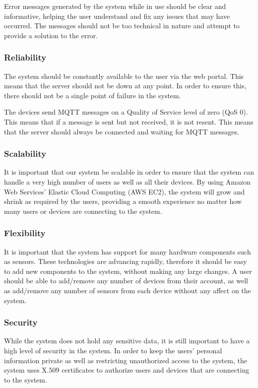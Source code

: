 \documentclass{article}
\begin{document}
			Error messages generated by the system while in use should be clear and informative, helping the user understand and fix any issues that may have occurred. The messages should not be too technical in nature and attempt to provide a solution to the error.
			
		\subsubsection{Reliability}
			The system should be constantly available to the user via the web portal. This means that the server should not be down at any point. In order to ensure this, there should not be a single point of failure in the system.
			
			The devices send MQTT messages on a Quality of Service level of zero (QoS 0). This means that if a message is sent but not received, it is not resent. This means that the server should always be connected and waiting for MQTT messages.
			
		\subsubsection{Scalability}
			It is important that our system be scalable in order to ensure that the system can handle a very high number of users as well as all their devices. By using Amazon Web Services' Elastic Cloud Computing (AWS EC2), the system will grow and shrink as required by the users, providing a smooth experience no matter how many users or devices are connecting to the system.
			
		\subsubsection{Flexibility}
			It is important that the system has support for many hardware components such as sensors. These technologies are advancing rapidly, therefore it should be easy to add new components to the system, without making any large changes. A user should be able to add/remove any number of devices from their account, as well as add/remove any number of sensors from each device without any affect on the system.
			
		\subsubsection{Security}
			While the system does not hold any sensitive data, it is still important to have a high level of security in the system. In order to keep the users' personal information private as well as restricting unauthorized access to the system, the system uses X.509 certificates to authorize users and devices that are connecting to the system.
			
\end{document}

